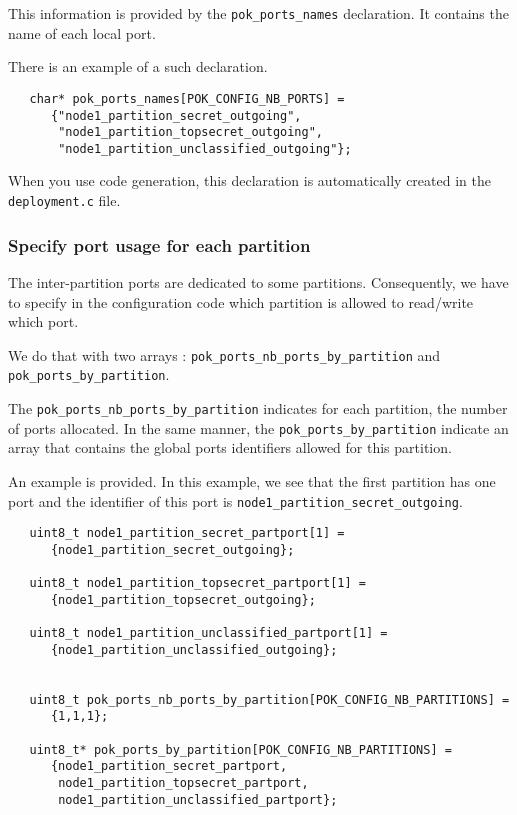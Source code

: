    This information is provided by the \texttt{pok\_ports\_names} declaration.
   It contains the name of each local port.

   There is an example of a such declaration.
   \begin{verbatim}
   char* pok_ports_names[POK_CONFIG_NB_PORTS] =
      {"node1_partition_secret_outgoing",
       "node1_partition_topsecret_outgoing",
       "node1_partition_unclassified_outgoing"};
   \end{verbatim}

   When you use code generation, this declaration is
   automatically created in the \texttt{deployment.c} file.

   \subsubsection{Specify port usage for each partition}
   The inter-partition ports are dedicated to some partitions. Consequently, we
   have to specify in the configuration code which partition is allowed to
   read/write which port. 

   We do that with two arrays : \texttt{pok\_ports\_nb\_ports\_by\_partition} and 
   \texttt{pok\_ports\_by\_partition}.

   The  \texttt{pok\_ports\_nb\_ports\_by\_partition} indicates for each
   partition, the number of ports allocated. In the same manner, the
   \texttt{pok\_ports\_by\_partition} indicate an array that contains the global
   ports identifiers allowed for this partition.

   An example is provided. In this example, we see that the first partition has
   one port and the identifier of this port is
   \texttt{node1\_partition\_secret\_outgoing}.

   \begin{verbatim}
   uint8_t node1_partition_secret_partport[1] =
      {node1_partition_secret_outgoing};

   uint8_t node1_partition_topsecret_partport[1] =
      {node1_partition_topsecret_outgoing};

   uint8_t node1_partition_unclassified_partport[1] =
      {node1_partition_unclassified_outgoing};


   uint8_t pok_ports_nb_ports_by_partition[POK_CONFIG_NB_PARTITIONS] =
      {1,1,1};

   uint8_t* pok_ports_by_partition[POK_CONFIG_NB_PARTITIONS] =
      {node1_partition_secret_partport,
       node1_partition_topsecret_partport,
       node1_partition_unclassified_partport};
   \end{verbatim}

